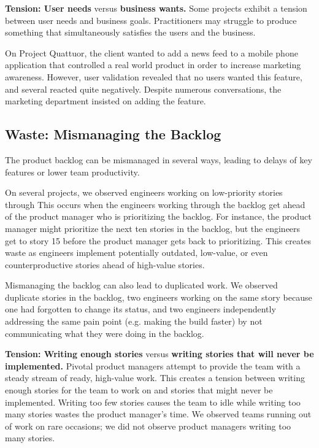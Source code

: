 \textbf{Tension: User needs} versus \textbf{business wants.}
Some projects exhibit a tension between user needs and business goals. Practitioners may struggle to produce something that simultaneously satisfies the users and the business.

On Project Quattuor, the client wanted to add a news feed to a mobile phone application that controlled a real world product in order to increase marketing awareness. However, user validation revealed that no users wanted this feature, and several reacted quite negatively. Despite numerous conversations, the marketing department insisted on adding the feature. 
\subsection{Waste: Mismanaging the Backlog}
The product backlog can be mismanaged in several ways, leading to delays of key features or lower team productivity. 

On several projects, we observed engineers working on low-priority stories through  This occurs when the engineers working through the backlog get ahead of the product manager who is prioritizing the backlog. For instance, the product manager might prioritize the next ten stories in the backlog, but the engineers get to story 15 before the product manager gets back to prioritizing. This creates waste as engineers implement potentially outdated, low-value, or even counterproductive stories ahead of high-value stories.   

Mismanaging the backlog can also lead to duplicated work. We observed duplicate stories in the backlog, two engineers working on the same story because one had forgotten to change its status, and two engineers independently addressing the same pain point (e.g. making the build faster) by not communicating what they were doing in the backlog.

\textbf{Tension: Writing enough stories} versus \textbf{writing stories that will never be implemented.}
Pivotal product managers attempt to provide the team with a steady stream of ready, high-value work. This creates a tension between writing enough stories for the team to work on and  stories that might never be implemented. Writing too few stories causes the team to idle while writing too many stories wastes the product manager's time. We observed teams running out of work on rare occasions; we did not observe product managers writing too many stories.  

